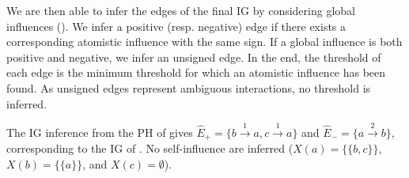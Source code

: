 \begin{comment}
Given a configuration $\sigma\in\prod_{c\in\gamma(b\rightarrow a)} L_c$, 
$\focals(a,\{a_i\},\ctx_b(\sigma))$ gives the bounces that a given process $a_i$ can make in the
context $\ctx_b(\sigma)$.
We note $\sigma\{b_i\}$ the configuration $\sigma$ where the process of sort $b$ has been replaced
by $b_i$.
If there exists $b_i,b_{i+1}\in L_b$ such that one bounce in 
$\focals(a, \{\sigma[a]\}, \ctx_b(\sigma\{b_i\}))$
has a lower (resp. higher) level that one bounce in
$\focals(a, \{\sigma[a]\}, \ctx_b(\sigma\{b_{i+1}\}))$, then
$b$ as positive (resp. negative) influence on $a$ with a maximum threshold $l=i+1$.

Then, we infer that $a$ has a self-influence if its current level can have an impact on its own
evolution at a given configuration $\sigma$.
We consider here a configuration $\sigma$ of a group $g$ of sorts having a cooperation on $a$.
This set of sort groups is given by $X(a)$ (\pref{eq:influence-groups}) which returns the set of
connected components (noted $\mathcal C$) of the graph linking two regulators $b,c$ of $a$ if there
is a cooperative sort hitting $a$ regulated by both of them.
Given $a_i,a_{i+1}\in L_a$, we pick $a_j\in\focals(a,\{a_i\},\ctx_g(\sigma\{a_i\}))$ and
$a_k\in\focals(a,\{a_{i+1}\},\ctx_g(\sigma\{a_{i+1}\}))$.
If $k=j+1$, we can not conclude as there is no difference in the evolution of both levels.
If $k\neq j+1$ and $k-j\neq 0$, then $a_i$ and $a_{i+1}$ have divergent evolutions: we infer an
influence of sign of $k-j$ at threshold $i+1$.
We note that some aspects of this inference are arbitrary and may impact the number of parameters to
infer in the next section.
In particular, in some cases, the use of intervals for Thomas' parameters drops the requirement of
inferring a self-activation.
\end{comment}

We are then able to infer the edges of the final IG by considering global influences ().
We infer a positive (resp. negative) edge if there exists a corresponding atomistic influence with the same
sign. If a global influence is both positive and negative, we infer an unsigned edge. In the end, the
threshold of each edge is the minimum threshold for which an atomistic influence has been found. As unsigned
edges represent ambiguous interactions, no threshold is inferred.

\begin{example*}
The IG inference from the PH of  gives
$\hat{E}_+ = \{b \xrightarrow{1} a, c \xrightarrow{1} a\}$ and 
$\hat{E}_- = \{a \xrightarrow{2} b\}$, corresponding to the IG of .
No self-influence are inferred ($X(a) = \{ \{b,c\} \}$, $X(b)=\{ \{a\}\}$, and $X(c)=\emptyset$).
\end{example*}
